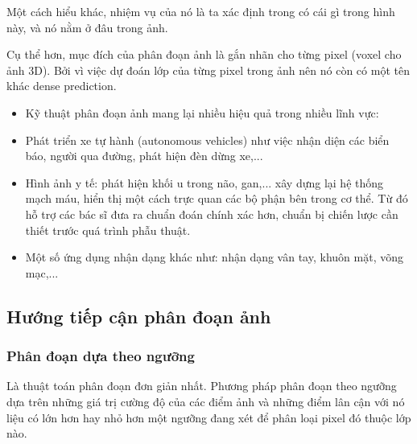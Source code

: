 Một cách hiểu khác, nhiệm vụ của nó là ta xác định trong có cái gì trong hình này, và nó nằm ở đâu trong ảnh. \par

Cụ thể hơn, mục đích của phân đoạn ảnh là gắn nhãn cho từng pixel (voxel cho ảnh 3D). Bởi vì việc dự đoán lớp của từng pixel trong ảnh nên nó còn có một tên khác dense prediction.

\begin{itemize}
    \item[] Kỹ thuật phân đoạn ảnh mang lại nhiều hiệu quả trong nhiều lĩnh vực:
	\item Phát triển xe tự hành (autonomous vehicles) như việc nhận diện các biển báo, người qua đường, phát hiện đèn dừng xe,... 
	\item Hình ảnh y tế: phát hiện khối u trong não, gan,... xây dựng lại hệ thống mạch máu, hiển thị một cách trực quan các bộ phận bên trong cơ thể. Từ đó hỗ trợ các bác sĩ đưa ra chuẩn đoán chính xác hơn, chuẩn bị chiến lược cần thiết trước quá trình phẫu thuật.
	\item Một số ứng dụng nhận dạng khác như: nhận dạng vân tay, khuôn mặt, võng mạc,...
\end{itemize}

\subsection{Hướng tiếp cận phân đoạn ảnh}
\subsubsection{Phân đoạn dựa theo ngưỡng}
Là thuật toán phân đoạn đơn giản nhất. Phương pháp phân đoạn theo ngưỡng dựa trên những giá trị cường độ của các điểm ảnh và những điểm lân cận với nó liệu có lớn hơn hay nhỏ hơn một ngưỡng đang xét để phân loại pixel đó thuộc lớp nào.

\newpage

